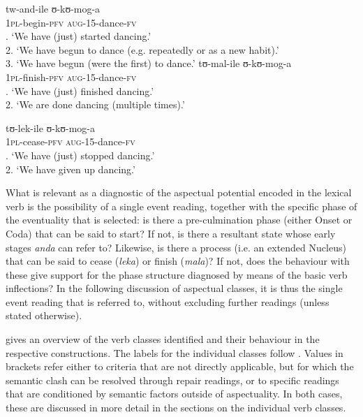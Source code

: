 \begin{exe}
\ex \label{exAndaVagheit} \gll tw-and-ile ʊ-kʊ-mog-a\\
\textsc{1pl}-begin-\textsc{pfv} \textsc{aug}-15-dance-\textsc{fv}\\
. \lq We have (just) started dancing.'\\
2. \lq We have begun to dance (e.g. repeatedly or as a new habit).'\\
3. \lq We have begun (were the first) to dance.' 
\ex\label{exMalaVagheit} \gll tʊ-mal-ile ʊ-kʊ-mog-a\\
\textsc{1pl}-finish-\textsc{pfv} \textsc{aug}-15-dance-\textsc{fv}\\
. \lq We have (just) finished dancing.'\\
2. \lq We are done dancing (multiple times).'

\ex\label{exLekaVagheit}\gll tʊ-lek-ile ʊ-kʊ-mog-a\\
\textsc{1pl}-cease-\textsc{pfv} \textsc{aug}-15-dance-\textsc{fv}\\
. \lq We have (just) stopped dancing.'\\
2. \lq We have given up dancing.'
\end{exe}

What is relevant as a diagnostic of the aspectual potential encoded in the lexical verb is the possibility of a single event reading, together with the specific phase of the eventuality that is selected: is there a pre-culmination phase (either Onset or Coda) that can be said to start? If not, is there a resultant state whose early stages \textit{anda} can refer to? Likewise, is there a process (i.e. an extended Nucleus) that can be said to cease (\textit{leka}) or finish (\textit{mala})? If not, does the behaviour with these  give support for the phase structure diagnosed by means of the basic verb inflections? In the following discussion of aspectual classes, it is thus the single event reading that is referred to, without excluding further readings (unless stated otherwise).\label{SingleEventReading}

 gives an overview of the verb classes identified and their behaviour in the respective constructions. The labels for the individual classes follow \citet{BotneR2003}. Values in brackets refer either to criteria that are not directly applicable, but for which the semantic clash can be resolved through repair readings, or to specific readings that are conditioned by semantic factors outside of aspectuality. In both cases, these are discussed in more detail in the sections on the individual verb classes.

